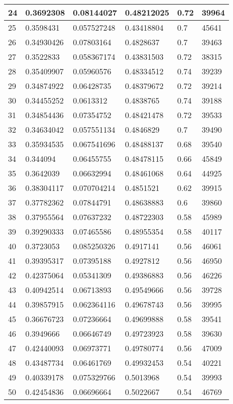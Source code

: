 \begin{longtable}{|l|l|l|l|l|l|}
24 & 0.3692308 & 0.08144027 & 0.48212025 & 0.72 & 39964 \\ \hline 
25 & 0.3598431 & 0.057527248 & 0.43418804 & 0.7 & 45641 \\ \hline 
26 & 0.34930426 & 0.07803164 & 0.4828637 & 0.7 & 39463 \\ \hline 
27 & 0.3522833 & 0.058367174 & 0.43831503 & 0.72 & 38315 \\ \hline 
28 & 0.35409907 & 0.05960576 & 0.48334512 & 0.74 & 39239 \\ \hline 
29 & 0.34874922 & 0.06428735 & 0.48379672 & 0.72 & 39214 \\ \hline 
30 & 0.34455252 & 0.0613312 & 0.4838765 & 0.74 & 39188 \\ \hline 
31 & 0.34854436 & 0.07354752 & 0.48421478 & 0.72 & 39533 \\ \hline 
32 & 0.34634042 & 0.057551134 & 0.4846829 & 0.7 & 39490 \\ \hline 
33 & 0.35934535 & 0.067541696 & 0.48488137 & 0.68 & 39540 \\ \hline 
34 & 0.344094 & 0.06455755 & 0.48478115 & 0.66 & 45849 \\ \hline 
35 & 0.3642039 & 0.06632994 & 0.48461068 & 0.64 & 44925 \\ \hline 
36 & 0.38304117 & 0.070704214 & 0.4851521 & 0.62 & 39915 \\ \hline 
37 & 0.37782362 & 0.07844791 & 0.48638883 & 0.6 & 39860 \\ \hline 
38 & 0.37955564 & 0.07637232 & 0.48722303 & 0.58 & 45989 \\ \hline 
39 & 0.39290333 & 0.07465586 & 0.48955354 & 0.58 & 40117 \\ \hline 
40 & 0.3723053 & 0.085250326 & 0.4917141 & 0.56 & 46061 \\ \hline 
41 & 0.39395317 & 0.07395188 & 0.4927812 & 0.56 & 46950 \\ \hline 
42 & 0.42375064 & 0.05341309 & 0.49386883 & 0.56 & 46226 \\ \hline 
43 & 0.40942514 & 0.06713893 & 0.49549666 & 0.56 & 39728 \\ \hline 
44 & 0.39857915 & 0.062364116 & 0.49678743 & 0.56 & 39995 \\ \hline 
45 & 0.36676723 & 0.07236664 & 0.49699888 & 0.58 & 39541 \\ \hline 
46 & 0.3949666 & 0.06646749 & 0.49723923 & 0.58 & 39630 \\ \hline 
47 & 0.42440093 & 0.06973771 & 0.49780774 & 0.56 & 47009 \\ \hline 
48 & 0.43487734 & 0.06461769 & 0.49932453 & 0.54 & 40221 \\ \hline 
49 & 0.40339178 & 0.075329766 & 0.5013968 & 0.54 & 39993 \\ \hline 
50 & 0.42454836 & 0.06696664 & 0.5022667 & 0.54 & 46769 \\ \hline 
\end{longtable}